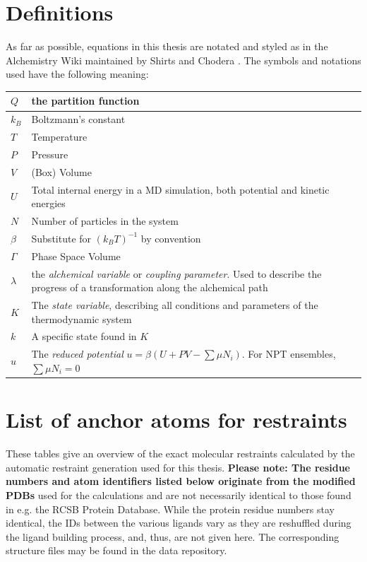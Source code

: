 \documentclass[oneside]{scrreprt}
\begin{document}
\section{Definitions}
As far as possible, equations in this thesis are notated and styled as in the Alchemistry Wiki maintained by Shirts and Chodera \cite{shirts_alchemistrywiki_nodate}. The symbols and notations used have the following meaning:
\begin{center}
    

\begin{tabular}{ | m{3cm} | m{10cm}| }
\hline
$Q$ & the partition function\\
\hline
$k_B$ & Boltzmann's constant\\
\hline
$T$ & Temperature \\
\hline
$P$ & Pressure \\
\hline
$V$ & (Box) Volume\\
\hline
$U$ & Total internal energy in a MD simulation, both potential and kinetic energies\\
\hline
$N$ & Number of particles in the system\\
\hline
$\beta$ & Substitute for $(k_B T)^{-1}$ by convention \\
\hline
$\Gamma$ & Phase Space Volume \\
\hline
$\lambda$ & the \emph{alchemical variable} or \emph{coupling parameter}. Used to describe the progress of a transformation along the alchemical path\\
\hline
$K$ & The \emph{state variable}, describing all conditions and parameters of the thermodynamic system\\
\hline
$k$ & A specific state found in $K$\\
\hline
$u$ & The \emph{reduced potential} $u=\beta(U+PV-\sum{\mu N_i}) $. For NPT ensembles, $\sum{\mu N_i} = 0$\\
\hline
\end{tabular}
\end{center}

\section{List of anchor atoms for restraints}
These tables give an overview of the exact molecular restraints calculated by the automatic restraint generation used for this thesis. \textbf{Please note: The residue numbers and atom identifiers listed below originate from the modified PDBs} used for the calculations and are not necessarily identical to those found in e.g. the RCSB Protein Database. While the protein residue numbers stay identical, the IDs between the various ligands vary as they are reshuffled during the ligand building process, and, thus, are not given here. The corresponding structure files may be found in the data repository.
\end{document}
